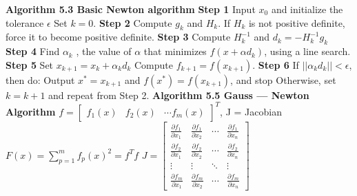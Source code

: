 \begin{multicols}{3}
\textbf{Algorithm 5.3 Basic Newton algorithm} \newline
\textbf{Step 1} \newline
Input $x_0$ and initialize the tolerance $\epsilon$ \newline
Set $k = 0$. \newline
\textbf{Step 2} \newline
Compute $g_k$ and $H_k$. \newline
If $H_k$ is not positive definite, force it to become positive definite. \newline
\textbf{Step 3} \newline
Compute $H_k^{-1}$ and $d_k=-H_k^{-1}g_k$ \newline
\textbf{Step 4} \newline
Find $\alpha_k$ , the value of $\alpha$ that minimizes $f(x+\alpha d_k)$, using a line search. \newline
\textbf{Step 5} \newline
Set $x_{k+1}=x_k+\alpha_k d_k$ \newline
Compute $f_{k+1}=f(x_{k+1})$. \newline
\textbf{Step 6} \newline
If $||\alpha_k d_k|| < \epsilon$, then do:  \newline
Output $x^*=x_{k+1}$ and $f(x^*)=f(x_{k+1})$, and stop \newline
Otherwise, set $k = k + 1$ and repeat from Step 2. \newline
\textbf{Algorithm 5.5 Gauss --- Newton Algorithm} \newline
$f=\begin{bmatrix}
f_1(x)  & f_2(x) & \cdots f_m(x)
\end{bmatrix}^T$, J = Jacobian \newline
$F(x)=\sum_{p=1}^{m}f_p(x)^2=f^Tf$ \newline
$J=\begin{bmatrix}
\frac{ \partial f_1}{\partial  x_1} & \frac{ \partial  f_1}{ \partial  x_2} & \cdots & \frac{\partial  f_1}{\partial  x_n} \\
\frac{\partial  f_2}{\partial x_1} & \frac{\partial  f_2}{\partial  x_2} & \cdots & \frac{\partial  f_2}{\partial x_n} \\
\vdots & \vdots & \ddots & \vdots \\
\frac{\partial f_m}{\partial  x_1}& \frac{\partial f_m}{\partial  x_2}& \cdots & \frac{\partial f_m}{\partial x_n}
\end{bmatrix}$ \newline

\end{multicols}
